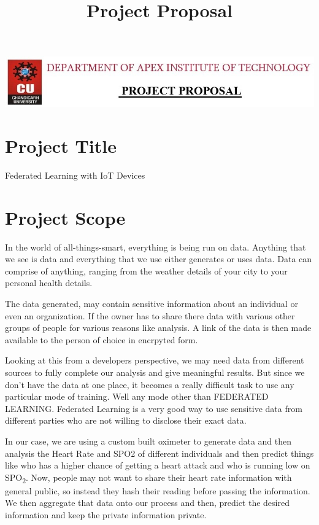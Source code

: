 \documentclass{article}
\title{Project Proposal}
\author{}
\date{}
\begin{document}
\includegraphics[width=\textwidth]{private/Header.jpeg}
\vspace{3em}

\section{Project Title}

\Large{Federated Learning with IoT Devices}

\section{Project Scope}

In the world of all-things-smart, everything is being run on data. Anything that we see is data and everything that we use either generates or uses data. Data can comprise of anything, ranging from the weather details of your city to your personal health details.

The data generated, may contain sensitive information about an individual or even an organization. If the owner has to share there data with various other groups of people for various reasons like analysis. A link of the data is then made available to the person of choice in encrpyted form.

Looking at this from a developers perspective, we may need data from different sources to fully complete our analysis and give meaningful results. But since we don't have the data at one place, it becomes a really difficult task to use any particular mode of training. Well any mode other than FEDERATED LEARNING. Federated Learning is a very good way to use sensitive data from different parties who are not willing to disclose their exact data. 

In our case, we are using a custom built oximeter to generate data and then analysis the Heart Rate and SPO2 of different individuals and then predict things like who has a higher chance of getting a heart attack and who is running low on SPO\textsubscript{2}. Now, people may not want to share their heart rate information with general public, so instead they hash their reading before passing the information. We then aggregate that data onto our process and then, predict the desired information and keep the private information private.
\end{document}
